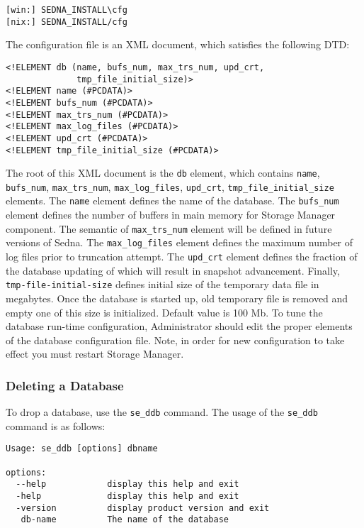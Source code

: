 \documentclass[a4paper,12pt]{article}
\begin{document}
\begin{verbatim}
[win:] SEDNA_INSTALL\cfg
[nix:] SEDNA_INSTALL/cfg
\end{verbatim}

The configuration file is an XML document, which satisfies the following DTD:

\small{
\begin{verbatim}
<!ELEMENT db (name, bufs_num, max_trs_num, upd_crt, 
              tmp_file_initial_size)>
<!ELEMENT name (#PCDATA)>
<!ELEMENT bufs_num (#PCDATA)>
<!ELEMENT max_trs_num (#PCDATA)>
<!ELEMENT max_log_files (#PCDATA)>
<!ELEMENT upd_crt (#PCDATA)>
<!ELEMENT tmp_file_initial_size (#PCDATA)>
\end{verbatim}}

The root of this XML document is the \verb!db! element, which contains
\verb!name!, \verb!bufs_num!, \verb!max_trs_num!, \verb!max_log_files!,
\verb!upd_crt!, \verb!tmp_file_initial_size! elements. The \verb!name! element
defines the name of the database. The \verb!bufs_num! element defines the number
of buffers in main memory for Storage Manager component. The semantic of
\verb!max_trs_num! element will be defined in future versions of Sedna. The
\verb!max_log_files! element defines the maximum number of log files prior to
truncation attempt. The \verb!upd_crt! element defines the fraction of the
database updating of which will result in snapshot advancement. Finally,
\verb!tmp-file-initial-size! defines initial size of the temporary data file in
megabytes. Once the database is started up, old temporary file is removed and
empty one of this size is initialized. Default value is 100 Mb.
To tune the database run-time configuration, Administrator should edit the
proper elements of the database configuration file. Note, in order for new
configuration to take effect you must restart Storage Manager.


\subsubsection{Deleting a Database}

To drop a database, use the \verb!se_ddb! command. The usage of the
\verb!se_ddb! command is as follows:

\small{
\begin{verbatim}
Usage: se_ddb [options] dbname

options:
  --help            display this help and exit
  -help             display this help and exit
  -version          display product version and exit
   db-name          The name of the database
\end{verbatim}}
\end{document}
